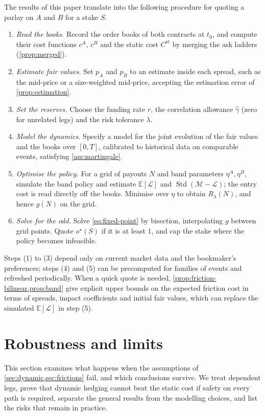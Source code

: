 \documentclass[11pt,a4paper]{article}
\theoremstyle{plain}
\theoremstyle{definition}
\theoremstyle{remark}
\newcommand{\E}{\mathbb{E}}
\newcommand{\1}{\mathbf{1}}
\begin{document}
The results of this paper translate into the following procedure for quoting a parlay on $A$ and $B$ for a stake $S$.
\begin{enumerate}[label=(\arabic*)]
  \item \emph{Read the books.} Record the order books of both contracts at $t_0$, and compute their cost functions $c^A$, $c^B$ and the static cost $C^{\mathrm{st}}$ by merging the ask ladders (\cref{prop:merged}).
  \item \emph{Estimate fair values.} Set $p_A$ and $p_B$ to an estimate inside each spread, such as the mid-price or a size-weighted mid-price, accepting the estimation error of \cref{prop:estimation}.
  \item \emph{Set the reserves.} Choose the funding rate $r$, the correlation allowance $\hat\gamma$ (zero for unrelated legs) and the risk tolerance $\lambda$.
  \item \emph{Model the dynamics.} Specify a model for the joint evolution of the fair values and the books over $[0,T]$, calibrated to historical data on comparable events, satisfying \cref{ass:martingale}.
  \item \emph{Optimise the policy.} For a grid of payouts $N$ and band parameters $\eta^A,\eta^B$, simulate the band policy and estimate $\E[\mathcal{L}]$ and $\operatorname{Std}(\mathcal{M}-\mathcal{L})$; the entry cost is read directly off the books. Minimise over $\eta$ to obtain $R_\lambda(N)$, and hence $g(N)$ on the grid.
  \item \emph{Solve for the odd.} Solve \eqref{eq:fixed-point} by bisection, interpolating $g$ between grid points. Quote $o^\star(S)$ if it is at least $1$, and cap the stake where the policy becomes infeasible.
\end{enumerate}
Steps (1) to (3) depend only on current market data and the bookmaker's preferences; steps (4) and (5) can be precomputed for families of events and refreshed periodically. When a quick quote is needed, \cref{prop:friction-bilinear,prop:band} give explicit upper bounds on the expected friction cost in terms of spreads, impact coefficients and initial fair values, which can replace the simulated $\E[\mathcal{L}]$ in step (5).

\section{Robustness and limits}
\label{sec:robust}
This section examines what happens when the assumptions of \cref{sec:dynamic,sec:frictions} fail, and which conclusions survive. We treat dependent legs, prove that dynamic hedging cannot beat the static cost if safety on every path is required, separate the general results from the modelling choices, and list the risks that remain in practice.
\end{document}
